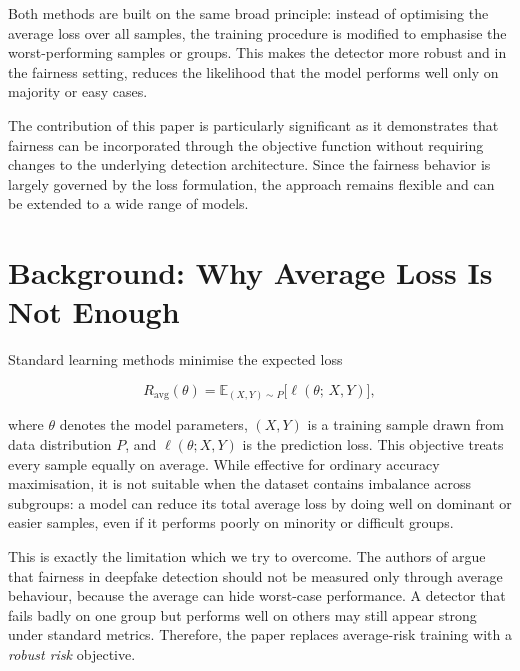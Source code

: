Both methods are built on the same broad principle: instead of optimising the average loss over all samples, the training procedure is modified to emphasise the worst-performing samples or groups. This makes the detector more robust and in the fairness setting, reduces the likelihood that the model performs well only on majority or easy cases. 

The contribution of this paper \cite{dag_paper} is particularly significant as it demonstrates that fairness can be incorporated through the objective function without requiring changes to the underlying detection architecture. Since the fairness behavior is largely governed by the loss formulation, the approach remains flexible and can be extended to a wide range of models.


\section{Background: Why Average Loss Is Not Enough}
\label{sec:ch4_avg_loss}

Standard learning methods minimise the expected loss

\begin{equation}
    R_{\mathrm{avg}}(\theta)
    = \mathbb{E}_{(X,Y)\sim P}\bigl[\ell(\theta;\,X,Y)\bigr],
    \label{eq:avg_risk}
\end{equation}

\noindent where $\theta$ denotes the model parameters, $(X,Y)$ is a training sample drawn from data distribution $P$, and $\ell(\theta;X,Y)$ is the prediction loss. This objective treats every sample equally on average. While effective for ordinary accuracy maximisation, it is not suitable when the dataset contains imbalance across subgroups: a model can reduce its total average loss by doing well on dominant or easier samples, even if it performs poorly on minority or difficult groups.

This is exactly the limitation which we try to overcome. The authors of \cite{dag_paper} argue that fairness in deepfake detection should not be measured only through average behaviour, because the average can hide worst-case performance. A detector that fails badly on one group but performs well on others may still appear strong under standard metrics. Therefore, the paper replaces average-risk training with a \emph{robust risk} objective.

